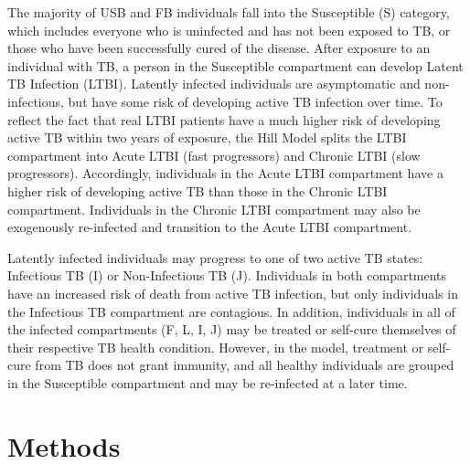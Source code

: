 \documentclass{amsart}
\begin{document}
The majority of USB and FB individuals fall into the Susceptible (S) category,
which includes everyone who is uninfected and has not been exposed to TB, or
those who have been successfully cured of the disease. After exposure to an
individual with TB, a person in the Susceptible compartment can develop Latent
TB Infection (LTBI). Latently infected individuals are asymptomatic and
non-infectious, but have some risk of developing active TB infection over time.
To reflect the fact that real LTBI patients have a much higher risk of
developing active TB within two years of exposure, the Hill Model splits the
LTBI compartment into Acute LTBI (fast progressors) and Chronic LTBI (slow
progressors). Accordingly, individuals in the Acute LTBI compartment have a
higher risk of developing active TB than those in the Chronic LTBI compartment.
Individuals in the Chronic LTBI compartment may also be exogenously re-infected
and transition to the Acute LTBI compartment. 

Latently infected individuals may progress to one of two active TB states: Infectious TB (I) or 
Non-Infectious TB (J).  Individuals in both compartments have an increased risk of death from
active TB infection, but only individuals in the Infectious TB compartment are contagious.  
In addition, individuals in all of the infected compartments (F, L, I, J) may be treated or self-cure
themselves of their respective TB health condition.  However, in the model, treatment or self-cure from TB
does not grant immunity, and all healthy individuals are grouped in the Susceptible compartment
and may be re-infected at a later time.\\

\section{Methods}
\end{document}
